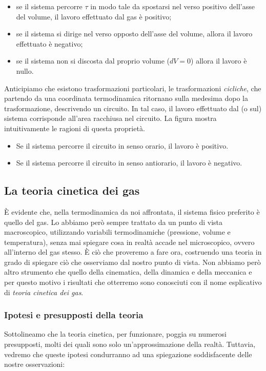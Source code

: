 \begin{itemize}
    \item se il sistema percorre $\tau$ in modo tale da spostarsi nel verso positivo
    dell'asse del volume, il lavoro effettuato dal gas è positivo;

    \item se il sistema si dirige nel verso opposto dell'asse del volume,
    allora il lavoro effettuato è negativo;

    \item se il sistema non si discosta dal proprio volume ($dV = 0$)
    allora il lavoro è nullo.
\end{itemize}

Anticipiamo che esistono trasformazioni particolari, le trasformazioni
\textit{cicliche}, che partendo da una coordinata termodinamica
ritornano sulla medesima dopo la trasformazione, descrivendo un circuito.
In tal caso, il lavoro effettuato dal (o sul) sistema corrisponde
all'area racchiusa nel circuito. La figura mostra intuitivamente le
ragioni di questa proprietà.

\begin{itemize}
    \item Se il sistema percorre il circuito in senso orario, il
    lavoro è positivo.

    \item Se il sistema percorre il circuito in senso antiorario,
    il lavoro è negativo.
\end{itemize}





\subsection{La teoria cinetica dei gas}
È evidente che, nella termodinamica da noi affrontata, il sistema
fisico preferito è quello del gas. Lo abbiamo però sempre trattato
da un punto di vista macroscopico, utilizzando variabili termodinamiche
(pressione, volume e temperatura), senza mai spiegare cosa in realtà
accade nel microscopico, ovvero all'interno del gas stesso. È ciò che proveremo
a fare ora, costruendo una teoria in grado di spiegare ciò che osserviamo
dal nostro punto di vista. Non abbiamo però altro strumento che quello della cinematica,
della dinamica e della meccanica
e per questo motivo i risultati che otterremo sono conosciuti con
il nome esplicativo di \textit{teoria cinetica dei gas}.

\subsubsection*{Ipotesi e presupposti della teoria}
Sottolineamo che la teoria cinetica, per funzionare, poggia su numerosi
presupposti, molti dei quali sono solo un'approssimazione della realtà.
Tuttavia, vedremo che queste ipotesi condurranno ad una spiegazione
soddisfacente delle nostre osservazioni:

